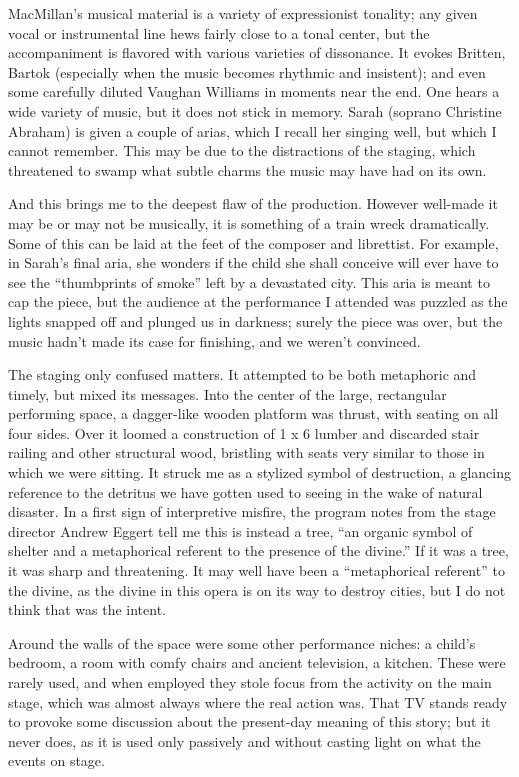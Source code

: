 MacMillan’s musical material is a variety of expressionist tonality; any given vocal or instrumental line hews fairly close to a tonal center, but the accompaniment is flavored with various varieties of dissonance. It evokes Britten, Bartok (especially when the music becomes rhythmic and insistent); and even some carefully diluted Vaughan Williams in moments near the end. One hears a wide variety of music, but it does not stick in memory. Sarah (soprano Christine Abraham) is given a couple of arias, which I recall her singing well, but which I cannot remember. This may be due to the distractions of the staging, which threatened to swamp what subtle charms the music may have had on its own.

And this brings me to the deepest flaw of the production. However well-made it may be or may not be musically, it is something of a train wreck dramatically. Some of this can be laid at the feet of the composer and librettist. For example, in Sarah’s final aria, she wonders if the child she shall conceive will ever have to see the “thumbprints of smoke” left by a devastated city. This aria is meant to cap the piece, but the audience at the performance I attended was puzzled as the lights snapped off and plunged us in darkness; surely the piece was over, but the music hadn’t made its case for finishing, and we weren’t convinced.

The staging only confused matters. It attempted to be both metaphoric and timely, but mixed its messages. Into the center of the large, rectangular performing space, a dagger-like wooden platform was thrust, with seating on all four sides. Over it loomed a construction of 1 x 6 lumber and discarded stair railing and other structural wood, bristling with seats very similar to those in which we were sitting. It struck me as a stylized symbol of destruction, a glancing reference to the detritus we have gotten used to seeing in the wake of natural disaster. In a first sign of interpretive misfire, the program notes from the stage director Andrew Eggert tell me this is instead a tree, “an organic symbol of shelter and a metaphorical referent to the presence of the divine.” If it was a tree, it was sharp and threatening. It may well have been a “metaphorical referent” to the divine, as the divine in this opera is on its way to destroy cities, but I do not think that was the intent.

Around the walls of the space were some other performance niches: a child’s bedroom, a room with comfy chairs and ancient television, a kitchen. These were rarely used, and when employed they stole focus from the activity on the main stage, which was almost always where the real action was. That TV stands ready to provoke some discussion about the present-day meaning of this story; but it never does, as it is used only passively and without casting light on what the events on stage.

